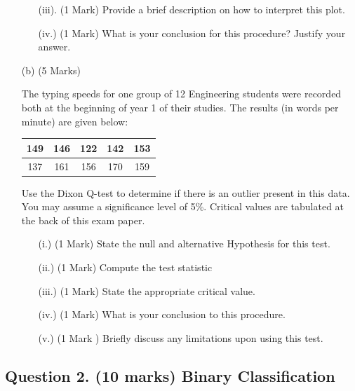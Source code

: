 \documentclass[a4paper,12pt]{article}
\begin{document}
\begin{itemize}
\begin{itemize}
	\item[(iii).] (1 Mark) Provide a brief description on how to interpret this plot.
	\item[(iv.)] (1 Mark) What is your conclusion for this procedure? Justify your answer.
\end{itemize}

\item[(b)] (5 Marks) 

The typing speeds for one group of 12 Engineering students were recorded both at the beginning of year 1 of their studies. The results (in words per minute) are given below:

\begin{center}
	\begin{tabular}{|c|c|c|c|c|}
		\hline
		149  & 146 & 122 & 142 &  153\\ \hline
		137 & 161 & 156&   170&  159
		\\ \hline
	\end{tabular}
\end{center}
Use the Dixon Q-test to determine if there is an outlier present in this data. You may assume a significance level of 5\%. Critical values are tabulated at the back of this exam paper.
\begin{itemize}
	\item[(i.)](1 Mark)	State the null and alternative Hypothesis for this test.
	\item[(ii.)](1 Mark) Compute the test statistic
	\item[(iii.)](1 Mark) State the appropriate critical value.
	\item[(iv.)](1 Mark) What is your conclusion to this procedure.
	\item[(v.)] (1 Mark ) Briefly discuss any limitations upon using this test.
\end{itemize}
\end{itemize} 



\subsection*{Question 2. (10 marks) Binary Classification }
\end{document}
